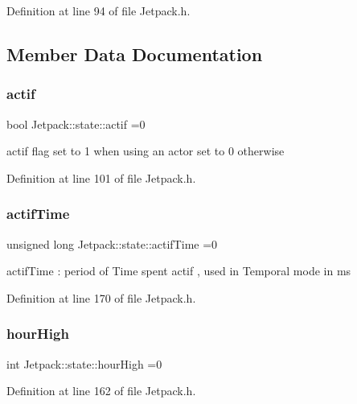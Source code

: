 Definition at line 94 of file Jetpack.\+h.



\subsection{Member Data Documentation}
\mbox{\label{struct_jetpack_1_1state_aa177541689bbaea21a4650a083b0df77}} 
\subsubsection{\texorpdfstring{actif}{actif}}
{\footnotesize\ttfamily bool Jetpack\+::state\+::actif =0}

actif flag set to 1 when using an actor set to 0 otherwise 

Definition at line 101 of file Jetpack.\+h.

\mbox{\label{struct_jetpack_1_1state_af2e1cc323ef9ffcc3cf4d203f85d726b}} 
\subsubsection{\texorpdfstring{actif\+Time}{actifTime}}
{\footnotesize\ttfamily unsigned long Jetpack\+::state\+::actif\+Time =0}

actif\+Time \+: period of Time spent actif , used in Temporal mode in ms 

Definition at line 170 of file Jetpack.\+h.

\mbox{\label{struct_jetpack_1_1state_ace824f4ae57fa1a4a27b2c6477b350e3}} 
\subsubsection{\texorpdfstring{hour\+High}{hourHigh}}
{\footnotesize\ttfamily int Jetpack\+::state\+::hour\+High =0}



Definition at line 162 of file Jetpack.\+h.

